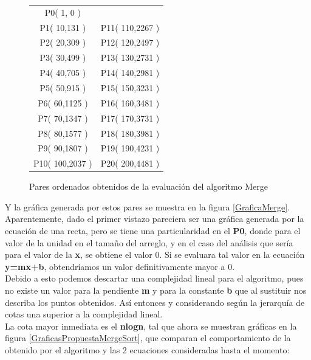         \begin{figure}[h!]
            \centering
            \begin{tabular}{c c}
                P0( 1, 0 ) & \\
                P1( 10,131 ) & P11( 110,2267 )\\
                P2( 20,309 ) & P12( 120,2497 )\\
                P3( 30,499 ) & P13( 130,2731 )\\
                P4( 40,705 ) & P14( 140,2981 )\\
                P5( 50,915 ) & P15( 150,3231 )\\
                P6( 60,1125 ) & P16( 160,3481 )\\
                P7( 70,1347 ) & P17( 170,3731 )\\
                P8( 80,1577 ) & P18( 180,3981 )\\
                P9( 90,1807 ) & P19( 190,4231 )\\
                P10( 100,2037 ) & P20( 200,4481 )\\
            \end{tabular}
            \caption{Pares ordenados obtenidos de la evaluación del algoritmo Merge}
            \label{PuntosMergeSort}
        \end{figure}
    
    Y la gráfica generada por estos pares se muestra en la figura \ref{GraficaMerge}.\\
    
    Aparentemente, dado el primer vistazo pareciera ser una gráfica generada por la ecuación de una recta, pero se tiene una particularidad en el \textbf{P0}, donde para el valor de la unidad en el tamaño del arreglo, y en el caso del análisis que sería para el valor de la \textbf{x}, se obtiene el valor 0. Si se evaluara tal valor en la ecuación \textbf{y=mx+b}, obtendríamos un valor definitivamente mayor a 0. \\
    
    Debido a esto podemos descartar una complejidad lineal para el algoritmo, pues no existe un valor para la pendiente \textbf{m} y para la constante \textbf{b} que al sustituir nos describa los puntos obtenidos. Así entonces y considerando según la jerarquía de cotas una superior a la complejidad lineal. \\
    
    La cota mayor inmediata es el \textbf{nlogn}, tal que ahora se muestran gráficas en la figura \ref{GraficasPropuestaMergeSort}, que comparan el comportamiento de la obtenido por el algoritmo y las 2 ecuaciones consideradas hasta el momento:\\
    
